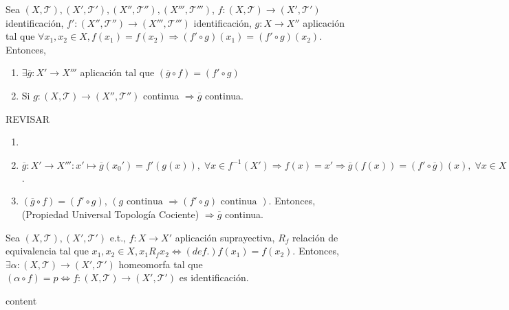 \begin{prop}
  Sea $( X, \mathcal{T} ), ( X', \mathcal{T}' ), ( X'', \mathcal{T}'' ), ( X''', \mathcal{T}''' )$, $f: ( X, \mathcal{T} ) \to ( X', \mathcal{T}' )$ identificación, $f': ( X'', \mathcal{T}'' ) \to ( X''', \mathcal{T}''' )$ identificación, $g: X \to X''$ aplicación tal que $\forall x_{1}, x_{2} \in X, f(x_{1}) = f(x_{2}) \Rightarrow (f' \circ g)(x_{1}) = (f' \circ g)(x_{2})$. Entonces,
  \begin{enumerate}[label=(\roman*)]
    \item $\exists \overline{g}: X' \to X'''$ aplicación tal que $(\overline{g} \circ f) = (f' \circ g)$
    \item Si $ g: ( X, \mathcal{T} ) \to ( X'', \mathcal{T}'' )$ continua $\Rightarrow \overline{g}$ continua.
  \end{enumerate}
\end{prop}

REVISAR

\begin{dem}
  \begin{enumerate}[label=(\roman*)]
    \item []
    \item $\overline{g}: X' \to X''': x' \mapsto \overline{g}(x_{0}') = f'(g(x)), \; \forall x \in f^{-1}(X') \Rightarrow f(x) = x' \Rightarrow \overline{g}(f(x)) = (f' \circ \overline{g})(x), \; \forall x \in X \Leftrightarrow (\overline{g} \circ f) = (f' \circ g)$.
    \item $(\overline{g} \circ f) = (f' \circ g)$, $(g \text{ continua } \Rightarrow (f' \circ g) \text{ continua })$. Entonces, (Propiedad Universal Topología Cociente) $\Rightarrow \overline{g}$ continua.
  \end{enumerate}
\end{dem}

\begin{prop}
  Sea $( X, \mathcal{T} ), ( X', \mathcal{T}' )$ e.t., $f: X \to X'$ aplicación suprayectiva, $R_{f}$ relación de equivalencia tal que $x_{1}, x_{2} \in X, x_{1} R_{f} x_{2} \Leftrightarrow(def.) f(x_{1}) = f(x_{2})$. Entonces, $\exists \alpha: ( X, \mathcal{T} ) \to ( X', \mathcal{T}' )$ homeomorfa tal que $(\alpha \circ f) = p \Leftrightarrow f: ( X, \mathcal{T} ) \to ( X', \mathcal{T}' )$ es identificación.
\end{prop}

\begin{dem}
  content
\end{dem}
